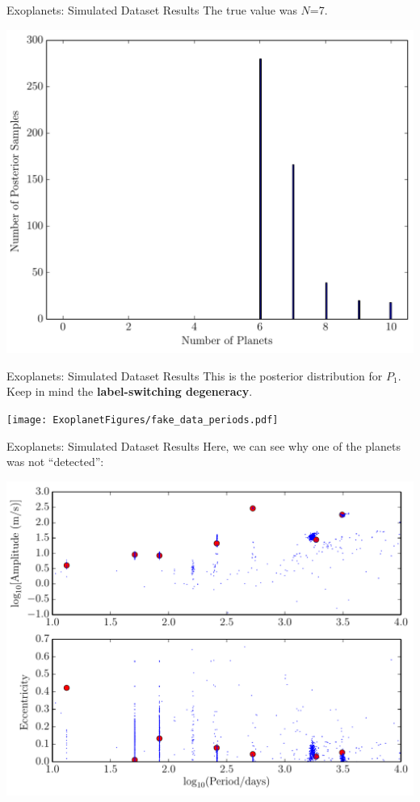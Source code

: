\begin{frame}[t]{Exoplanets: Simulated Dataset Results}
The true value was $N$=7.
\begin{center}
\includegraphics[scale=0.35]{ExoplanetFigures/fake_data_N.pdf}
\end{center}
\end{frame}

\begin{frame}[t]{Exoplanets: Simulated Dataset Results}
This is the posterior distribution for $P_1$. Keep in mind the {\bf
label-switching degeneracy}.
\begin{center}
\texttt{[image: ExoplanetFigures/fake\_data\_periods.pdf]}
\end{center}
\end{frame}

\begin{frame}[t]{Exoplanets: Simulated Dataset Results}
Here, we can see why one of the planets was not ``detected'':
\begin{center}
\includegraphics[scale=0.35]{ExoplanetFigures/fake_data_posterior.pdf}
\end{center}
\end{frame}

